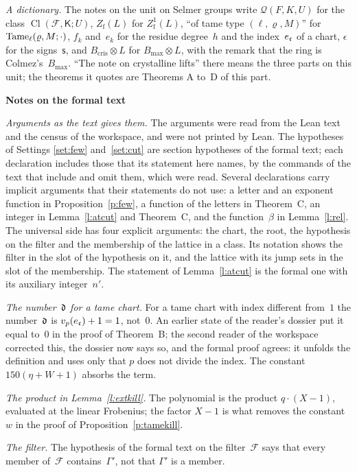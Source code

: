 \documentclass[11pt,a4paper]{article}
\newcommand{\m}[1]{\mbox{$#1$}}        %
\newcommand{\sect}[2]{\refstepcounter{section}\label{#2}\par\addvspace{19pt plus 4pt minus 2pt}\Needspace{7\baselineskip}%
  \noindent\llap{{\fontsize{13.2}{16}\selectfont\bfseries\color{inkfaint}\thesection}\hspace{9pt}}%
  {\fontsize{13.2}{16}\selectfont\bfseries\color{ink}#1}\par\nopagebreak\vspace{-1pt}}
\theoremstyle{plainx}
\theoremstyle{uprightx}
\providecommand{\InCl}[3]{\operatorname{Cl}(#1,#2;#3)}
\begin{document}
\emph{A dictionary.} The notes on the unit on Selmer groups write $\mathcal{Q}(F,K,U)$ for the class
$\InCl{\mathcal{F}}{\mathsf{K}}{U}$, $Z_{\mathrm{f}}(L)$ for $Z^{1}_{\mathrm{f}}(L)$, ``of tame type
\m{(\ell,\varrho,M)}'' for $\operatorname{Tame}_{\ell}(\varrho,M;\cdot)$, $f_k$ and~$e_k$ for the residue degree~$h$ and
the index~$e_{\mathfrak{c}}$ of a chart, $\epsilon$ for the signs~$\mathsf{s}$, and \m{B_{\mathrm{cris}}\otimes L} for
\m{B_{\max}\otimes L}, with the remark that the ring is Colmez's~$B_{\max}$. ``The note on crystalline lifts''
there means the three parts on this unit; the theorems it quotes are Theorems A to~D of this part.

\sect{Notes on the formal text}{s:notes}
\emph{Arguments as the text gives them.} The arguments were read from the Lean text and the census of the
workspace, and were not printed by Lean. The hypotheses of Settings \ref{set:few} and~\ref{set:cut} are
section hypotheses of the formal text; each declaration includes those that its statement here names, by the
commands of the text that include and omit them, which were read. Several declarations carry implicit
arguments that their statements do not use: a letter and an exponent function in
Proposition~\ref{p:few}, a function of the letters in Theorem~C, an integer in Lemma~\ref{l:atcut} and
Theorem~C, and the function~$\beta$ in Lemma~\ref{l:rel}. The universal side has four explicit arguments: the chart, the
root, the hypothesis on the filter and the membership of the lattice in a class. Its notation shows the filter
in the slot of the hypothesis on it, and the lattice with its jump sets in the slot of the membership. The statement of
Lemma~\ref{l:atcut} is the formal one with its auxiliary integer~$n'$.

\emph{The number~$\mathfrak{d}$ for a tame chart.} For a tame chart with index different from~$1$ the number~$\mathfrak{d}$ is
\m{v_p(e_{\fc})+1=1}, not~$0$. An earlier state of the reader's dossier put it equal to~$0$ in the proof of
Theorem~B; the second reader of the workspace corrected this, the dossier now says so, and the formal proof
agrees: it unfolds the definition and uses only that $p$ does not divide the index. The constant \m{150(\eta+W+1)} absorbs the term.

\emph{The product in Lemma~\ref{l:extkill}.} The polynomial is the product \m{q\cdot(X-1)}, evaluated at the
linear Frobenius; the factor \m{X-1} is what removes the constant~$w$ in the proof of
Proposition~\ref{p:tamekill}.

\emph{The filter.} The hypothesis of the formal text on the filter~$\mathcal{F}$ says that every member
of~$\mathcal{F}$ contains~$\Gamma'$, not that $\Gamma'$ is a member.
\end{document}
